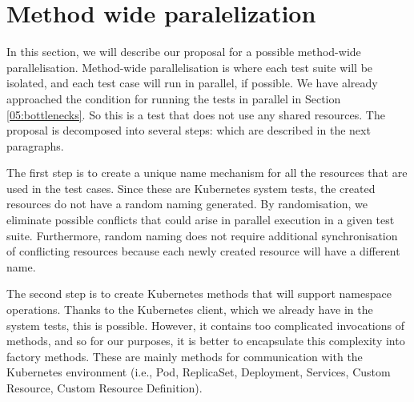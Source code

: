 \section{Method wide paralelization}
\label{04:methodwideparalelisation}

In this section, we will describe our proposal for a possible method-wide parallelisation.
Method-wide parallelisation is where each test suite will be isolated, and each test case will run in parallel, if possible.
We have already approached the condition for running the tests in parallel in Section \ref{05:bottlenecks}.
So this is a test that does not use any shared resources.
The proposal is decomposed into several steps: which are described in the next paragraphs.

The first step is to create a unique name mechanism for all the resources that are used in the test cases.
Since these are Kubernetes system tests, the created resources do not have a random naming generated.
By randomisation, we eliminate possible conflicts that could arise in parallel execution in a given test suite.
Furthermore, random naming does not require additional synchronisation of conflicting resources because each newly created resource will have a different name.

The second step is to create Kubernetes methods that will support namespace operations.
Thanks to the Kubernetes client, which we already have in the system tests, this is possible.
However, it contains too complicated invocations of methods, and so for our purposes, it is better to encapsulate this complexity into factory methods.
These are mainly methods for communication with the Kubernetes environment (i.e., Pod, ReplicaSet, Deployment, Services, Custom Resource, Custom Resource Definition).

